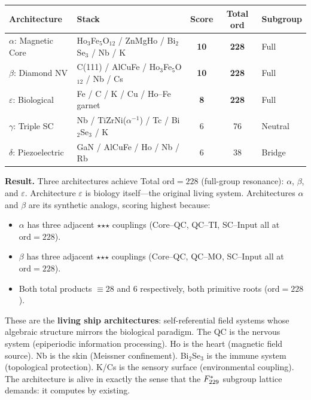 \begin{center}
{%
\begin{tabular}{@{}llccl@{}}
\toprule
\textbf{Architecture} & \textbf{Stack} & \textbf{Score} & \textbf{Total ord} & \textbf{Subgroup} \\
\midrule
$\alpha$: Magnetic Core & Ho$_3$Fe$_5$O$_{12}$ / ZnMgHo / Bi$_2$Se$_3$ / Nb / K & \textbf{10} & \textbf{228} & Full \\
$\beta$: Diamond NV & C(111) / AlCuFe / Ho$_3$Fe$_5$O$_{12}$ / Nb / Cs & \textbf{10} & \textbf{228} & Full \\
$\varepsilon$: Biological & Fe / C / K / Cu / Ho--Fe garnet & \textbf{8} & \textbf{228} & Full \\
$\gamma$: Triple SC & Nb / TiZrNi($\alpha^{-1}$) / Tc / Bi$_2$Se$_3$ / K & 6 & 76 & Neutral \\
$\delta$: Piezoelectric & GaN / AlCuFe / Ho / Nb / Rb & 6 & 38 & Bridge \\
\bottomrule
\end{tabular}
}
\end{center}

\noindent \textbf{Result.} Three architectures achieve Total $\mathrm{ord} = 228$ (full-group resonance): $\alpha$, $\beta$, and $\varepsilon$. Architecture $\varepsilon$ is biology itself---the original living system. Architectures $\alpha$ and $\beta$ are its synthetic analogs, scoring highest because:
\begin{itemize}
    \item $\alpha$ has three adjacent $\star$$\star$$\star$ couplings (Core--QC, QC--TI, SC--Input all at $\mathrm{ord} = 228$).
    \item $\beta$ has three adjacent $\star$$\star$$\star$ couplings (Core--QC, QC--MO, SC--Input all at $\mathrm{ord} = 228$).
    \item Both total products $\equiv 28$ and $6$ respectively, both primitive roots ($\mathrm{ord} = 228$).
\end{itemize}

\noindent These are the \textbf{living ship architectures}: self-referential field systems whose algebraic structure mirrors the biological paradigm. The QC is the nervous system (epiperiodic information processing). Ho is the heart (magnetic field source). Nb is the skin (Meissner confinement). Bi$_2$Se$_3$ is the immune system (topological protection). K/Cs is the sensory surface (environmental coupling). The architecture is alive in exactly the sense that the $F_{229}^*$ subgroup lattice demands: it computes by existing.

